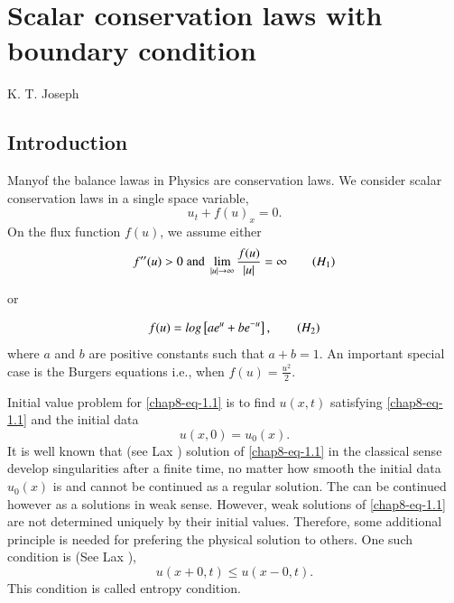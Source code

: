 \chapter{Scalar conservation laws with boundary condition}\label{chap8}

\begin{center}
K. T. Joseph
\end{center}



\section{Introduction}\label{chap8-sec-1}

\setcounter{pageoriginal}{186}
Many\pageoriginale of the balance lawas in Physics are conservation laws. We consider scalar conservation laws in a single space variable,
\begin{equation}\label{chap8-eq-1.1}
u_{t}+f(u)_{x} = 0.
\end{equation}
On the flux function $f(u)$, we assume either
\begin{equation}\label{chap8-eq-H1}
f''(u)> 0 \;\text{and}\; \lim\limits_{|u|\rightarrow \infty}\dfrac{f(u)}{|u|}= \infty\tag{$H_{1}$}
\end{equation}

\begin{center}
or
\end{center}
\begin{equation}\label{chap8-eq-H2}
f(u) = log\left[ae^{u} + be^{-u}\right],\tag{$H_{2}$}
\end{equation}
where $a$ and $b$ are positive constants such that $a+b=1$. An important special case is the Burgers equations i.e., when $f(u) = \frac{u^{2}}{2}$.

Initial value problem for \eqref{chap8-eq-1.1} is to find $u(x, t)$ satisfying  \eqref{chap8-eq-1.1} and the initial data
\begin{equation}\label{chap8-eq-1.2}
u(x, 0) = u_{0}(x).
\end{equation}
It is well known that (see Lax \cite{chap8-key8}) solution of \eqref{chap8-eq-1.1} in the classical sense develop singularities after a finite time, no matter how smooth the initial data $u_{0}(x)$ is and cannot be continued as a regular solution. The can be continued however as a solutions in weak sense. However, weak solutions of \eqref{chap8-eq-1.1} are not determined uniquely by their initial values. Therefore, some additional principle is needed for prefering the physical solution to others. One such condition is (See Lax \cite{chap8-key9}),
\begin{equation}\label{chap8-eq-1.3}
u(x+0, t)\leq u(x-0,t).
\end{equation}
This condition is called entropy condition.

